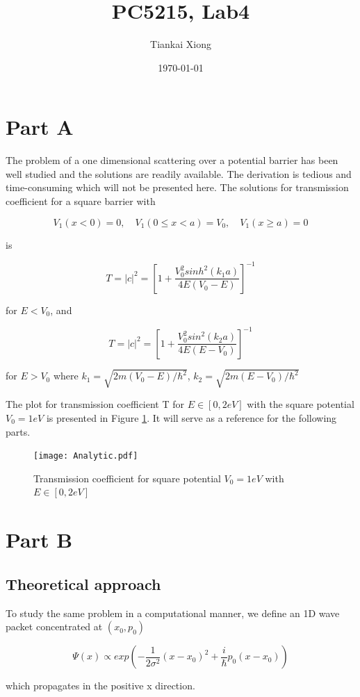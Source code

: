 \documentclass{article}
\author{Tiankai Xiong}
\date{\today}
\title{PC5215, Lab4}
\begin{document}
\maketitle

\section{Part A}
\label{sec-1}

The problem of a one dimensional scattering over a potential barrier
has been well studied and the solutions are readily available. The
derivation is tedious and time-consuming which will not be presented
here. The solutions for transmission coefficient for a square
barrier with

$$V_1(x < 0) = 0, \quad V_1(0\leq x < a) = V_0, \quad V_1(x \geq a) = 0$$

is

$$T = |c|^2 = [1+ \frac{V_0^2 sinh^2(k_1 a)}{4E(V_0-E)}]^{-1}$$

for $E < V_0$, and

$$T = |c|^2 = [1+ \frac{V_0^2 sin^2(k_2 a)}{4E(E-V_0)}]^{-1}$$

for $E> V_0$ where $k_1 = \sqrt{2m(V_0-E)/\hbar^2}$, $k_2 = \sqrt{2m(E-V_0)/\hbar^2}$

The plot for transmission coefficient T for $E \in [0, 2eV]$ with
the square potential $V_0 = 1 eV$ is presented in Figure
\ref{fig:analytic}. It will serve as a reference for the following parts.

\begin{figure}[h]
  \centering
  \texttt{[image: Analytic.pdf]}
  \caption{Transmission coefficient for square potential $V_0 = 1 eV$ with $E \in [0, 2 eV]$}
  \label{fig:analytic}
\end{figure}

\section{Part B}
\label{sec-2}

\subsection{Theoretical approach}
\label{sec-2-1}
To study the same problem in a computational manner, we define an
1D wave packet concentrated at $(x_0, p_0)$

$$\Psi(x) \propto exp(-\frac{1}{2 \sigma^2}(x-x_0)^2 + \frac{i}{\hbar}p_0(x-x_0))$$

which propagates in the positive x direction.
\end{document}
